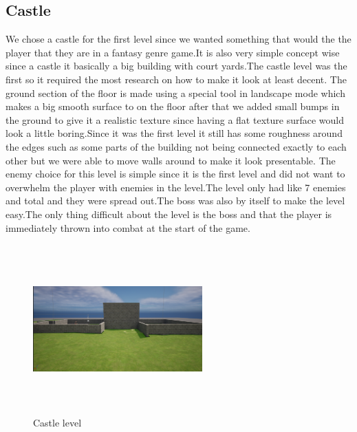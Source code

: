 \documentclass{sigchi}
\begin{document}
\subsection{Castle}
We chose a castle for the first level since we wanted something that would the the player that they are in a fantasy genre game.It is also very simple concept wise since a castle it basically  a big building with court yards.The castle level was the first so it required the most research on how to make it look at least decent. The ground section of the floor is made using a special tool in landscape mode which makes a big smooth surface to on the floor after that we added small bumps in the ground to give it a realistic texture since having a flat texture surface would look a little boring.Since it was the first level it still has some roughness around the edges such as some parts of the building not being connected exactly to each other but we were able to move walls around to make it look presentable. The enemy choice for this level is simple since it is the first level and did not want to overwhelm the player with enemies in the level.The level only had like 7 enemies  and total and they were spread out.The boss was also by itself to make the level easy.The only thing difficult about the level is the boss and that the player is immediately thrown into combat at the start of the game.  
\begin{figure}


\includegraphics[width=6.5cm, height=6.5cm]{Figure/castle.png}
\caption{Castle level}
\end{figure}
\end{document}
